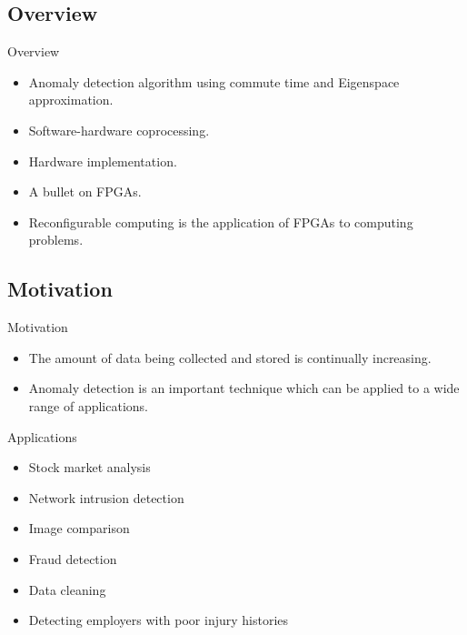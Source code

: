 \subsection{Overview}
\begin{frame}[label=overview]{Overview}
    \begin{itemize}
        \item Anomaly detection algorithm using commute time and Eigenspace
            approximation.
        \item Software-hardware coprocessing.
        \item Hardware implementation.
        \item A bullet on FPGAs.
        \item Reconfigurable computing is the application of FPGAs to computing problems.
    \end{itemize}
\end{frame}

\subsection{Motivation}
\begin{frame}[label=motivation]{Motivation}
    \begin{itemize}
        \item The amount of data being collected and stored is continually
            increasing.
        \item Anomaly detection is an important technique which can be applied
            to a wide range of applications.
    \end{itemize}
\end{frame}

\begin{frame}[label=applications]{Applications}
    \begin{itemize}
        \item Stock market analysis
        \item Network intrusion detection
        \item Image comparison
        \item Fraud detection
        \item Data cleaning
        \item Detecting employers with poor injury histories
    \end{itemize}
\end{frame}

